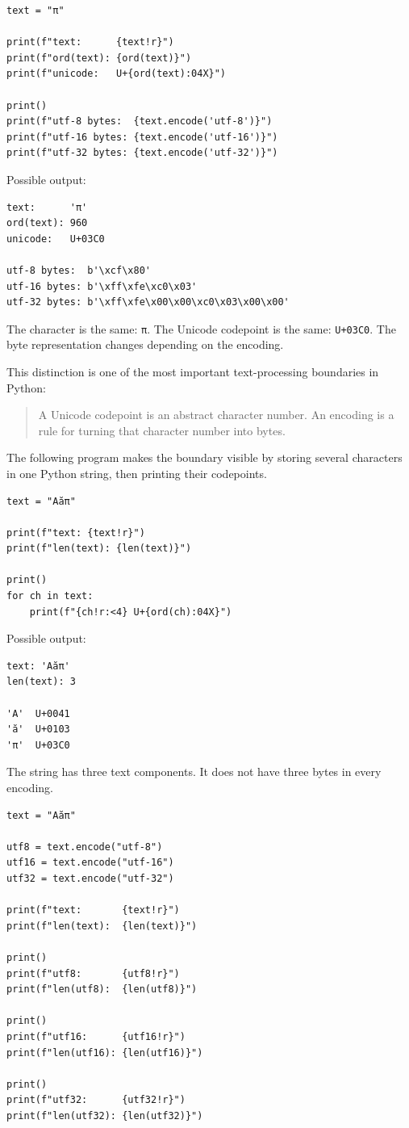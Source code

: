 \begin{verbatim}
text = "π"

print(f"text:      {text!r}")
print(f"ord(text): {ord(text)}")
print(f"unicode:   U+{ord(text):04X}")

print()
print(f"utf-8 bytes:  {text.encode('utf-8')}")
print(f"utf-16 bytes: {text.encode('utf-16')}")
print(f"utf-32 bytes: {text.encode('utf-32')}")
\end{verbatim}

Possible output:

\begin{verbatim}
text:      'π'
ord(text): 960
unicode:   U+03C0

utf-8 bytes:  b'\xcf\x80'
utf-16 bytes: b'\xff\xfe\xc0\x03'
utf-32 bytes: b'\xff\xfe\x00\x00\xc0\x03\x00\x00'
\end{verbatim}

The character is the same: \texttt{π}. The Unicode codepoint is the same: \texttt{U+03C0}. The byte representation changes depending on the encoding.

This distinction is one of the most important text-processing boundaries in Python:

\begin{quote}
A Unicode codepoint is an abstract character number. An encoding is a rule for turning that character number into bytes.
\end{quote}

The following program makes the boundary visible by storing several characters in one Python string, then printing their codepoints.

\begin{verbatim}
text = "Aăπ"

print(f"text: {text!r}")
print(f"len(text): {len(text)}")

print()
for ch in text:
    print(f"{ch!r:<4} U+{ord(ch):04X}")
\end{verbatim}

Possible output:

\begin{verbatim}
text: 'Aăπ'
len(text): 3

'A'  U+0041
'ă'  U+0103
'π'  U+03C0
\end{verbatim}

The string has three text components. It does not have three bytes in every encoding.

\begin{verbatim}
text = "Aăπ"

utf8 = text.encode("utf-8")
utf16 = text.encode("utf-16")
utf32 = text.encode("utf-32")

print(f"text:       {text!r}")
print(f"len(text):  {len(text)}")

print()
print(f"utf8:       {utf8!r}")
print(f"len(utf8):  {len(utf8)}")

print()
print(f"utf16:      {utf16!r}")
print(f"len(utf16): {len(utf16)}")

print()
print(f"utf32:      {utf32!r}")
print(f"len(utf32): {len(utf32)}")
\end{verbatim}

